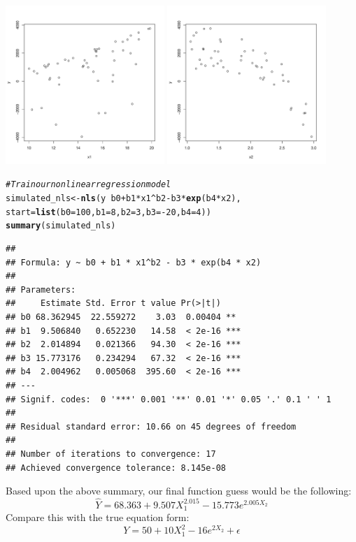 \documentclass{article}\usepackage[]{graphicx}\usepackage[]{color}
\makeatletter
\newcommand{\hlnum}[1]{\textcolor[rgb]{0.686,0.059,0.569}{#1}}%
\newcommand{\hlcom}[1]{\textcolor[rgb]{0.678,0.584,0.686}{\textit{#1}}}%
\newcommand{\hlopt}[1]{\textcolor[rgb]{0,0,0}{#1}}%
\newcommand{\hlstd}[1]{\textcolor[rgb]{0.345,0.345,0.345}{#1}}%
\newcommand{\hlkwb}[1]{\textcolor[rgb]{0.69,0.353,0.396}{#1}}%
\newcommand{\hlkwc}[1]{\textcolor[rgb]{0.333,0.667,0.333}{#1}}%
\newcommand{\hlkwd}[1]{\textcolor[rgb]{0.737,0.353,0.396}{\textbf{#1}}}%
\newenvironment{kframe}{%
 \def\at@end@of@kframe{}%
 \ifinner\ifhmode%
  \def\at@end@of@kframe{\end{minipage}}%
  \begin{minipage}{\columnwidth}%
 \fi\fi%
 \def\FrameCommand##1{\hskip\@totalleftmargin \hskip-\fboxsep
 \colorbox{shadecolor}{##1}\hskip-\fboxsep
     \hskip-\linewidth \hskip-\@totalleftmargin \hskip\columnwidth}%
 \MakeFramed {\advance\hsize-\width
   \@totalleftmargin\z@ \linewidth\hsize
   \@setminipage}}%
 {\par\unskip\endMakeFramed%
 \at@end@of@kframe}
\newenvironment{knitrout}{}{} %
\makeatother
\begin{document}
\begin{knitrout}
{\centering \includegraphics[width=0.45\textwidth]{figure/unnamed-chunk-12-1} 
\includegraphics[width=0.45\textwidth]{figure/unnamed-chunk-12-2} 

}



\end{knitrout}

\begin{knitrout}
\color{fgcolor}\begin{kframe}
\begin{alltt}
\hlcom{# Train our nonlinear regression model}
\hlstd{simulated_nls} \hlkwb{<-} \hlkwd{nls}\hlstd{(y} \hlopt{~} \hlstd{b0} \hlopt{+} \hlstd{b1}\hlopt{*}\hlstd{x1}\hlopt{^}\hlstd{b2} \hlopt{-} \hlstd{b3}\hlopt{*}\hlkwd{exp}\hlstd{(b4}\hlopt{*}\hlstd{x2),}
                     \hlkwc{start} \hlstd{=} \hlkwd{list}\hlstd{(}\hlkwc{b0} \hlstd{=} \hlnum{100}\hlstd{,} \hlkwc{b1} \hlstd{=} \hlnum{8}\hlstd{,} \hlkwc{b2} \hlstd{=} \hlnum{3}\hlstd{,} \hlkwc{b3} \hlstd{=} \hlopt{-}\hlnum{20}\hlstd{,} \hlkwc{b4} \hlstd{=} \hlnum{4}\hlstd{))}
\hlkwd{summary}\hlstd{(simulated_nls)}
\end{alltt}
\begin{verbatim}
## 
## Formula: y ~ b0 + b1 * x1^b2 - b3 * exp(b4 * x2)
## 
## Parameters:
##     Estimate Std. Error t value Pr(>|t|)    
## b0 68.362945  22.559272    3.03  0.00404 ** 
## b1  9.506840   0.652230   14.58  < 2e-16 ***
## b2  2.014894   0.021366   94.30  < 2e-16 ***
## b3 15.773176   0.234294   67.32  < 2e-16 ***
## b4  2.004962   0.005068  395.60  < 2e-16 ***
## ---
## Signif. codes:  0 '***' 0.001 '**' 0.01 '*' 0.05 '.' 0.1 ' ' 1
## 
## Residual standard error: 10.66 on 45 degrees of freedom
## 
## Number of iterations to convergence: 17 
## Achieved convergence tolerance: 8.145e-08
\end{verbatim}
\end{kframe}
\end{knitrout}

Based upon the above summary, our final function guess would be the following:
\[\hat{Y} = 68.363 + 9.507 X_1^{2.015} - 15.773 e^{2.005 X_2}\]
Compare this with the true equation form:
\[Y = 50 + 10 X_1^2 - 16 e^{2 X_2} + \epsilon\]
\end{document}
